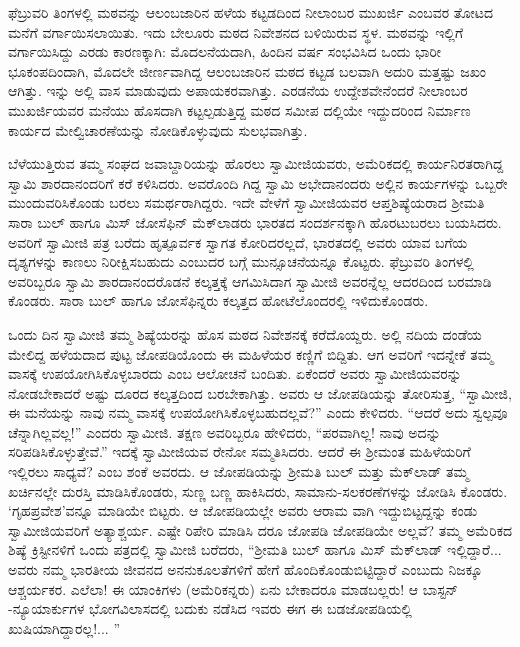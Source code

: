 ಫೆಬ್ರುವರಿ ತಿಂಗಳಲ್ಲಿ ಮಠವನ್ನು ಆಲಂಬಜಾರಿನ ಹಳೆಯ ಕಟ್ಟಡದಿಂದ ನೀಲಾಂಬರ ಮುಖರ್ಜಿ ಎಂಬವರ ತೋಟದ ಮನೆಗೆ ವರ್ಗಾಯಿಸಲಾಯಿತು. ಇದು ಬೇಲೂರು ಮಠದ ನಿವೇಶನದ ಬಳಿಯಿರುವ ಸ್ಥಳ. ಮಠವನ್ನು ಇಲ್ಲಿಗೆ ವರ್ಗಾಯಿಸಿದ್ದು ಎರಡು ಕಾರಣಕ್ಕಾಗಿ: ಮೊದಲನೆಯದಾಗಿ, ಹಿಂದಿನ ವರ್ಷ ಸಂಭವಿಸಿದ ಒಂದು ಭಾರೀ ಭೂಕಂಪದಿಂದಾಗಿ, ಮೊದಲೇ ಜೀರ್ಣವಾಗಿದ್ದ ಆಲಂಬಜಾರಿನ ಮಠದ ಕಟ್ಟಡ ಬಲವಾಗಿ ಅದುರಿ ಮತ್ತಷ್ಟು ಜಖಂ ಆಗಿತ್ತು. ಇನ್ನು ಅಲ್ಲಿ ವಾಸ ಮಾಡುವುದು ಅಪಾಯಕರವಾಗಿತ್ತು. ಎರಡನೆಯ ಉದ್ದೇಶವೇನೆಂದರೆ ನೀಲಾಂಬರ ಮುಖರ್ಜಿಯವರ ಮನೆಯು ಹೊಸದಾಗಿ ಕಟ್ಟಲ್ಪಡುತ್ತಿದ್ದ ಮಠದ ಸಮೀಪ ದಲ್ಲಿಯೇ ಇದ್ದುದರಿಂದ ನಿರ್ಮಾಣ ಕಾರ್ಯದ ಮೇಲ್ವಿಚಾರಣೆಯನ್ನು ನೋಡಿಕೊಳ್ಳುವುದು ಸುಲಭವಾಗಿತ್ತು.

ಬೆಳೆಯುತ್ತಿರುವ ತಮ್ಮ ಸಂಘದ ಜವಾಬ್ದಾರಿಯನ್ನು ಹೊರಲು ಸ್ವಾಮೀಜಿಯವರು, ಅಮೆರಿಕದಲ್ಲಿ ಕಾರ್ಯನಿರತರಾಗಿದ್ದ ಸ್ವಾಮಿ ಶಾರದಾನಂದರಿಗೆ ಕರೆ ಕಳಿಸಿದರು. ಅವರೊಂದಿ ಗಿದ್ದ ಸ್ವಾಮಿ ಅಭೇದಾನಂದರು ಅಲ್ಲಿನ ಕಾರ್ಯಗಳನ್ನು ಒಬ್ಬರೇ ಮುಂದುವರಿಸಿಕೊಂಡು ಬರಲು ಸಮರ್ಥರಾಗಿದ್ದರು. ಇದೇ ವೇಳೆಗೆ ಸ್ವಾಮೀಜಿಯವರ ಆಪ್ತಶಿಷ್ಯೆಯರಾದ ಶ್ರೀಮತಿ ಸಾರಾ ಬುಲ್ ಹಾಗೂ ಮಿಸ್ ಜೋಸೆಫಿನ್ ಮೆಕ್​ಲಾಡರು ಭಾರತದ ಸಂದರ್ಶನಕ್ಕಾಗಿ ಹೊರಟುಬರಲು ಬಯಸಿದರು. ಅವರಿಗೆ ಸ್ವಾಮೀಜಿ ಪತ್ರ ಬರೆದು ಹೃತ್ಪೂರ್ವಕ ಸ್ವಾಗತ ಕೋರಿದರಲ್ಲದೆ, ಭಾರತದಲ್ಲಿ ಅವರು ಯಾವ ಬಗೆಯ ದೃಶ್ಯಗಳನ್ನು ಕಾಣಲು ನಿರೀಕ್ಷಿಸಬಹುದು ಎಂಬುದರ ಬಗ್ಗೆ ಮುನ್ಸೂಚನೆಯನ್ನೂ ಕೊಟ್ಟರು. ಫೆಬ್ರುವರಿ ತಿಂಗಳಲ್ಲಿ ಅವರಿಬ್ಬರೂ ಸ್ವಾಮಿ ಶಾರದಾನಂದರೊಡನೆ ಕಲ್ಕತ್ತಕ್ಕೆ ಆಗಮಿಸಿದಾಗ ಸ್ವಾಮೀಜಿ ಅವರನ್ನೆಲ್ಲ ಆದರದಿಂದ ಬರಮಾಡಿ ಕೊಂಡರು. ಸಾರಾ ಬುಲ್ ಹಾಗೂ ಜೋಸೆಫಿನ್ನರು ಕಲ್ಕತ್ತದ ಹೋಟೆಲೊಂದರಲ್ಲಿ ಇಳಿದುಕೊಂಡರು.

ಒಂದು ದಿನ ಸ್ವಾಮೀಜಿ ತಮ್ಮ ಶಿಷ್ಯೆಯರನ್ನು ಹೊಸ ಮಠದ ನಿವೇಶನಕ್ಕೆ ಕರೆದೊಯ್ದರು. ಅಲ್ಲಿ ನದಿಯ ದಂಡೆಯ ಮೇಲಿದ್ದ ಹಳೆಯದಾದ ಪುಟ್ಟ ಜೋಪಡಿಯೊಂದು ಈ ಮಹಿಳೆಯರ ಕಣ್ಣಿಗೆ ಬಿದ್ದಿತು. ಆಗ ಅವರಿಗೆ ಇದನ್ನೇಕೆ ತಮ್ಮ ವಾಸಕ್ಕೆ ಉಪಯೋಗಿಸಿಕೊಳ್ಳಬಾರದು ಎಂಬ ಆಲೋಚನೆ ಬಂದಿತು. ಏಕೆಂದರೆ ಅವರು ಸ್ವಾಮೀಜಿಯವರನ್ನು ನೋಡಬೇಕಾದರೆ ಅಷ್ಟು ದೂರದ ಕಲ್ಕತ್ತದಿಂದ ಬರಬೇಕಾಗಿತ್ತು. ಅವರು ಆ ಜೋಪಡಿಯನ್ನು ತೋರಿಸುತ್ತ, “ಸ್ವಾಮೀಜಿ, ಈ ಮನೆಯನ್ನು ನಾವು ನಮ್ಮ ವಾಸಕ್ಕೆ ಉಪಯೋಗಿಸಿಕೊಳ್ಳಬಹುದಲ್ಲವೆ?” ಎಂದು ಕೇಳಿದರು. “ಆದರೆ ಅದು ಸ್ವಲ್ಪವೂ ಚೆನ್ನಾಗಿಲ್ಲವಲ್ಲ!” ಎಂದರು ಸ್ವಾಮೀಜಿ. ತಕ್ಷಣ ಅವರಿಬ್ಬರೂ ಹೇಳಿದರು, “ಪರವಾಗಿಲ್ಲ! ನಾವು ಅದನ್ನು ಸರಿಪಡಿಸಿಕೊಳ್ಳುತ್ತೇವೆ.” ಇದಕ್ಕೆ ಸ್ವಾಮೀಜಿಯವ ರೇನೋ ಸಮ್ಮತಿಸಿದರು. ಆದರೆ ಈ ಶ್ರೀಮಂತ ಮಹಿಳೆಯರಿಗೆ ಇಲ್ಲಿರಲು ಸಾಧ್ಯವೆ? ಎಂಬ ಶಂಕೆ ಅವರದು. ಆ ಜೋಪಡಿಯನ್ನು ಶ್ರೀಮತಿ ಬುಲ್ ಮತ್ತು ಮೆಕ್​ಲಾಡ್ ತಮ್ಮ ಖರ್ಚಿನಲ್ಲೇ ದುರಸ್ತಿ ಮಾಡಿಸಿಕೊಂಡರು, ಸುಣ್ಣ ಬಣ್ಣ ಹಾಕಿಸಿದರು, ಸಾಮಾನು-ಸಲಕರಣೆಗಳನ್ನು ಜೋಡಿಸಿ ಕೊಂಡರು. ‘ಗೃಹಪ್ರವೇಶ’ವನ್ನೂ ಮಾಡಿಯೇ ಬಿಟ್ಟರು. ಆ ಜೋಪಡಿಯಲ್ಲೇ ಅವರು ಆರಾಮ ವಾಗಿ ಇದ್ದುಬಿಟ್ಟದ್ದನ್ನು ಕಂಡು ಸ್ವಾಮೀಜಿಯವರಿಗೆ ಅತ್ಯಾಶ್ಚರ್ಯ. ಎಷ್ಟೇ ರಿಪೇರಿ ಮಾಡಿಸಿ ದರೂ ಜೋಪಡಿ ಜೋಪಡಿಯೇ ಅಲ್ಲವೆ? ತಮ್ಮ ಅಮೆರಿಕದ ಶಿಷ್ಯೆ ಕ್ರಿಸ್ಟೀನಳಿಗೆ ಒಂದು ಪತ್ರದಲ್ಲಿ ಸ್ವಾಮೀಜಿ ಬರೆದರು, “ಶ್ರೀಮತಿ ಬುಲ್ ಹಾಗೂ ಮಿಸ್ ಮೆಕ್​ಲಾಡ್ ಇಲ್ಲಿದ್ದಾರೆ... ಅವರು ನಮ್ಮ ಭಾರತೀಯ ಜೀವನದ ಅನನುಕೂಲತೆಗಳಿಗೆ ಹೇಗೆ ಹೊಂದಿಕೊಂಡುಬಿಟ್ಟಿದ್ದಾರೆ ಎಂಬುದು ನಿಜಕ್ಕೂ ಆಶ್ಚರ್ಯಕರ. ಎಲೆಲಾ! ಈ ಯಾಂಕಿಗಳು (ಅಮೆರಿಕನ್ನರು) ಏನು ಬೇಕಾದರೂ ಮಾಡಬಲ್ಲರು! ಆ ಬಾಸ್ಟನ್​-ನ್ಯೂಯಾರ್ಕುಗಳ ಭೋಗವಿಲಾಸದಲ್ಲಿ ಬದುಕು ನಡೆಸಿದ ಇವರು ಈಗ ಈ ಬಡಜೋಪಡಿಯಲ್ಲಿ ಖುಷಿಯಾಗಿದ್ದಾರಲ್ಲ!... ”

